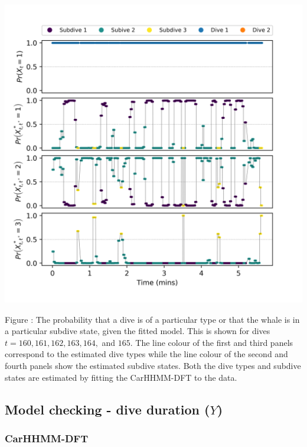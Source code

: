 \documentclass{article}
\begin{document}
        \begin{center}
        \includegraphics[width=6in]{../Plots/CarHMM_decoded_states.png}
        \end{center}
        
        \noindent Figure : The probability that a dive is of a particular type or that the whale is in a particular subdive state, given the fitted model. This is shown for dives $t = 160,161,162,163,164,$ and $165$. The line colour of the first and third panels correspond to the estimated dive types while the line colour of the second and fourth panels show the estimated subdive states. Both the dive types and subdive states are estimated by fitting the CarHHMM-DFT to the data.
        \addtocounter{fignum}{1}
        
    \newpage
    \subsection{Model checking - dive duration ($Y$)}
    
        \subsubsection{CarHHMM-DFT}
        
\end{document}
